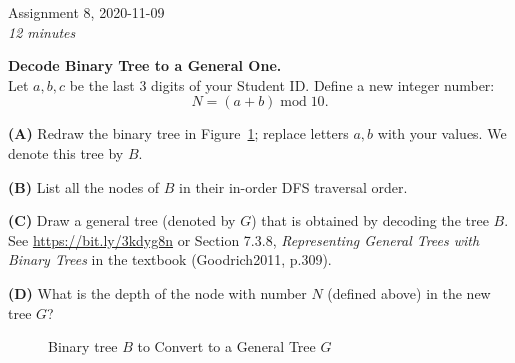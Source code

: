 \documentclass[a4paper,12pt]{article}
\begin{document}

\thispagestyle{empty}

\begin{center}
{\Large Assignment 8, 2020-11-09}\\
{\em 12 minutes} 
\end{center}

\noindent


\vspace{10pt} 
{\bf Decode Binary Tree to a General One.}\\

Let $a,b,c$ be the last $3$ digits of your Student ID. 
Define a new integer number:
$$N = (a + b) \;\text{mod}\; 10.$$ 

\vspace{5pt}
{\bf (A)} Redraw the binary tree in Figure~\ref{fig:heptagonal-nodes}; 
replace letters $a,b$ with your values. We denote this tree by $B$. 

\vspace{5pt}
{\bf (B)} List all the nodes of $B$ in their in-order DFS traversal order. 

\vspace{5pt} 
{\bf (C)} Draw a general tree (denoted by $G$) that is obtained
by decoding the tree $B$.\\
See \url{https://bit.ly/3kdyg8n} or  
Section 7.3.8, {\em Representing General Trees with Binary Trees}
in the textbook (Goodrich2011, p.309). 

\vspace{5pt} 
{\bf (D)} What is the depth of the node with number $N$ (defined above) in the new tree $G$?




\begin{figure}[!htb]
\caption{\label{fig:heptagonal-nodes} Binary tree $B$ to Convert to a General Tree $G$}
\end{figure}
\end{document}
